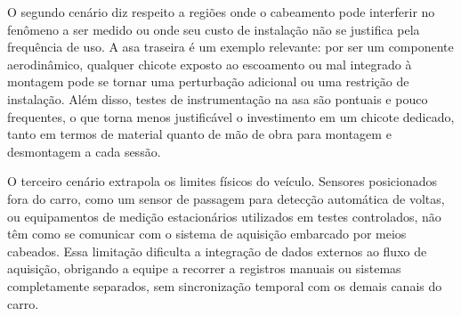 O segundo cenário diz respeito a regiões onde o cabeamento pode interferir no
fenômeno a ser medido ou onde seu custo de instalação não se justifica pela
frequência de uso. A asa traseira é um exemplo relevante: por ser um componente
aerodinâmico, qualquer chicote exposto ao escoamento ou mal integrado à montagem
pode se tornar uma perturbação adicional ou uma restrição de instalação. Além disso,
testes de instrumentação na asa são pontuais e pouco frequentes, o que torna menos
justificável o investimento em um chicote dedicado, tanto em termos de material
quanto de mão de obra para montagem e desmontagem a cada sessão.

O terceiro cenário extrapola os limites físicos do veículo. Sensores posicionados
fora do carro, como um sensor de passagem para detecção automática de voltas,
ou equipamentos de medição estacionários utilizados em testes controlados,
não têm como se comunicar com o sistema de aquisição embarcado por meios
cabeados. Essa limitação dificulta a integração de dados externos ao fluxo de aquisição,
obrigando a equipe a recorrer a registros manuais ou sistemas completamente
separados, sem sincronização temporal com os demais canais do carro.
